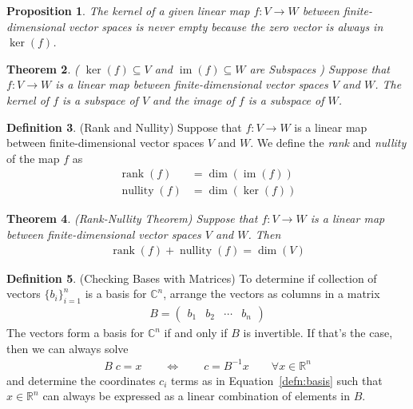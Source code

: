 \documentclass[12pt]{book}
\numberwithin{equation}{section} %
\theoremstyle{plain}
\newtheorem{thm}{Theorem}[section]
\newtheorem{prop}[thm]{Proposition}
\theoremstyle{definition}
\newtheorem{defn}[thm]{Definition}
\theoremstyle{remark}
\newcommand{\ra}{\rightarrow}
\newcommand{\Rn}{\mathbb{R}^n}
\newcommand{\Cn}{\mathbb{C}^n}
\begin{document}
\begin{prop}
The kernel of a given linear map $f:V\ra W$ between finite-dimensional
vector spaces is never empty because the zero vector is \emph{always} in
$\ker(f)$.
\end{prop}


\begin{thm}
\emph{(%
  $\operatorname{ker}(f)\subseteq V$
  and
  $\operatorname{im}(f)\subseteq W$
  are
  Subspaces%
)}
Suppose that $f:V\ra W$ is a linear map between finite-dimensional
vector spaces $V$ and $W$.
The kernel of $f$ is a subspace of $V$ and the image of $f$ is a
subspace of $W$.
\end{thm}



\begin{defn}(Rank and Nullity)
Suppose that $f:V\ra W$ is a linear map between finite-dimensional
vector spaces $V$ and $W$.
We define the \emph{rank} and \emph{nullity} of the map $f$ as
\begin{align*}
  \operatorname{rank}(f)
  &=
  \operatorname{dim}(\operatorname{im}(f))
  \\
  \operatorname{nullity}(f)
  &=
  \operatorname{dim}(\operatorname{ker}(f))
\end{align*}
\end{defn}


\begin{thm}
\emph{(Rank-Nullity Theorem)}
Suppose that $f:V\ra W$ is a linear map between finite-dimensional
vector spaces $V$ and $W$.
Then
\begin{align*}
  \operatorname{rank}(f)
  +
  \operatorname{nullity}(f)
  =
  \operatorname{dim}(V)
\end{align*}
\end{thm}


\begin{defn}{(Checking Bases with Matrices)}
To determine if collection of vectors $\{b_i\}_{i=1}^n$ is a basis for
$\Cn$, arrange the vectors as columns in a matrix
\begin{align*}
  B = \begin{pmatrix} b_1 & b_2 &\cdots & b_n \end{pmatrix}
\end{align*}
The vectors form a basis for $\Cn$ if and only if $B$ is invertible. If
that's the case, then we can always solve
\begin{align*}
  B \;c = x
  \qquad\Leftrightarrow\qquad
  c = {B}^{-1} x
  \qquad \forall x\in \Rn
\end{align*}
and determine the coordinates $c_i$ terms as in
Equation~\ref{defn:basis} such that $x \in \Rn$ can always be expressed
as a linear combination of elements in $B$.
\end{defn}
\end{document}

